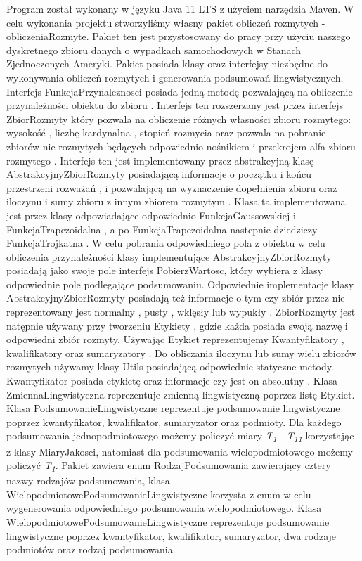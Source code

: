 \documentclass{classrep}
\begin{document}
Program został wykonany w języku Java 11 LTS z użyciem narzędzia Maven. W celu wykonania projektu stworzyliśmy własny pakiet obliczeń rozmytych - obliczeniaRozmyte. Pakiet ten jest przystosowany do pracy przy użyciu naszego dyskretnego zbioru danych o wypadkach samochodowych w Stanach Zjednoczonych Ameryki. Pakiet posiada klasy oraz interfejsy niezbędne do wykonywania obliczeń rozmytych i generowania podsumowań lingwistycznych. Interfejs FunkcjaPrzynaleznosci posiada jedną metodę pozwalającą na obliczenie przynależności obiektu do zbioru \cite{broniarska}.
Interfejs ten rozszerzany jest przez interfejs ZbiorRozmyty który pozwala na obliczenie różnych własności zbioru rozmytego: wysokość \cite{fuzzy}, liczbę kardynalna \cite{fuzzy}, stopień rozmycia \cite{niewiadomski19} oraz pozwala na pobranie zbiorów nie rozmytych będących odpowiednio nośnikiem \cite{broniarska} i przekrojem alfa zbioru rozmytego \cite{broniarska}. Interfejs ten jest implementowany przez abstrakcyjną klasę AbstrakcyjnyZbiorRozmyty posiadającą informacje o początku i końcu przestrzeni rozważań \cite{fuzzy}, i pozwalającą na wyznaczenie dopełnienia zbioru oraz iloczynu i sumy zbioru z innym zbiorem rozmytym \cite{fuzzy}. Klasa ta implementowana jest przez klasy odpowiadające odpowiednio FunkcjaGaussowskiej \cite{broniarska} i FunkcjaTrapezoidalna \cite{broniarska}, a po FunkcjaTrapezoidalna nastepnie dziedziczy FunkcjaTrojkatna \cite{broniarska}. W celu pobrania odpowiedniego pola z obiektu w celu obliczenia przynależności klasy implementujące AbstrakcyjnyZbiorRozmyty posiadają jako swoje pole interfejs PobierzWartosc, który wybiera z klasy odpowiednie pole podlegające podsumowaniu. Odpowiednie implementacje klasy AbstrakcyjnyZbiorRozmyty posiadają też informacje o tym czy zbiór przez nie reprezentowany jest normalny \cite{broniarska}, pusty \cite{broniarska}, wklęsły \cite{broniarska} lub wypukły \cite{broniarska}.
ZbiorRozmyty jest natępnie używany przy tworzeniu Etykiety \cite{niewiadomski19}, gdzie każda posiada swoją nazwę i odpowiedni zbiór rozmyty. Używając Etykiet reprezentujemy Kwantyfikatory \cite{niewiadomski19}, kwalifikatory \cite{niewiadomski19} oraz sumaryzatory \cite{niewiadomski19}. Do obliczania iloczynu lub sumy wielu zbiorów rozmytych używamy klasy Utils posiadającą odpowiednie statyczne metody. Kwantyfikator posiada etykietę oraz informacje czy jest on absolutny \cite{niewiadomski19}. Klasa ZmiennaLingwistyczna reprezentuje zmienną lingwistyczną poprzez listę Etykiet. Klasa PodsumowanieLingwistyczne reprezentuje podsumowanie lingwistyczne poprzez kwantyfikator, kwalifikator, sumaryzator oraz podmioty. Dla każdego podsumowania jednopodmiotowego możemy policzyć miary \textit{T\textsubscript{1}} - \textit{T\textsubscript{11}} korzystając z klasy MiaryJakosci, natomiast dla podsumowania wielopodmiotowego możemy policzyć \textit{T\textsubscript{1}}. Pakiet zawiera enum RodzajPodsumowania zawierający cztery nazwy rodzajów podsumowania, klasa WielopodmiotowePodsumowanieLingwistyczne korzysta z enum w celu wygenerowania odpowiedniego podsumowania wielopodmiotowego. Klasa WielopodmiotowePodsumowanieLingwistyczne reprezentuje podsumowanie lingwistyczne poprzez kwantyfikator, kwalifikator, sumaryzator, dwa rodzaje podmiotów oraz rodzaj podsumowania. \\
\end{document}
